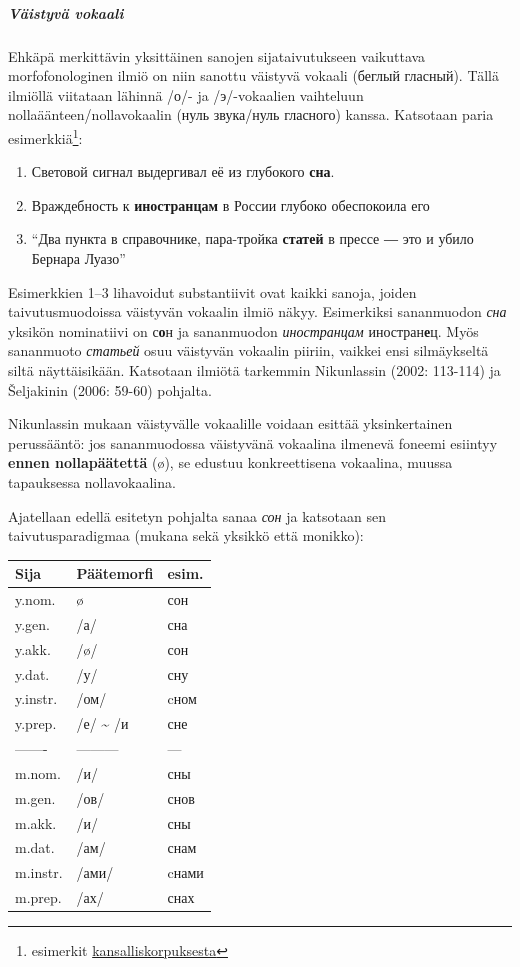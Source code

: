 \documentclass[]{scrartcl}
\providecommand{\tightlist}{%
  \setlength{\itemsep}{0pt}\setlength{\parskip}{0pt}}
\begin{document}
\subparagraph{Väistyvä vokaali}\label{vuxe4istyvuxe4-vokaali}

Ehkäpä merkittävin yksittäinen sanojen sijataivutukseen vaikuttava
morfofonologinen ilmiö on niin sanottu väistyvä vokaali (беглый
гласный). Tällä ilmiöllä viitataan lähinnä /о/- ja /э/-vokaalien
vaihteluun nollaäänteen/nollavokaalin (нуль звука/нуль гласного) kanssa.
Katsotaan paria esimerkkiä\footnote{esimerkit
  \href{http://ruscorpora.ru}{kansalliskorpuksesta}}:

\begin{enumerate}
\def\labelenumi{(\arabic{enumi})}
\tightlist
\item
  Световой сигнал выдергивал её из глубокого \textbf{сна}.
\item
  Враждебность к \textbf{иностранцам} в России глубоко обеспокоила его
\item
  ``Два пункта в справочнике, пара-тройка \textbf{статей} в прессе ― это
  и убило Бернара Луазо''
\end{enumerate}

Esimerkkien 1--3 lihavoidut substantiivit ovat kaikki sanoja, joiden
taivutusmuodoissa väistyvän vokaalin ilmiö näkyy. Esimerkiksi
sananmuodon \emph{сна} yksikön nominatiivi on с\textbf{о}н ja
sananmuodon \emph{иностранцам} иностран\textbf{е}ц. Myös sananmuoto
\emph{статьей} osuu väistyvän vokaalin piiriin, vaikkei ensi
silmäykseltä siltä näyttäisikään. Katsotaan ilmiötä tarkemmin
Nikunlassin (2002: 113-114) ja Šeljakinin (2006: 59-60) pohjalta.

Nikunlassin mukaan väistyvälle vokaalille voidaan esittää yksinkertainen
perussääntö: jos sananmuodossa väistyvänä vokaalina ilmenevä foneemi
esiintyy \textbf{ennen nollapäätettä} (ø), se edustuu konkreettisena
vokaalina, muussa tapauksessa nollavokaalina.

Ajatellaan edellä esitetyn pohjalta sanaa \emph{сон} ja katsotaan sen
taivutusparadigmaa (mukana sekä yksikkö että monikko):

\begin{longtable}[c]{@{}lll@{}}
\toprule
Sija & Päätemorfi & esim.\tabularnewline
\midrule
\endhead
y.nom. & ø & сон\tabularnewline
y.gen. & /а/ & сна\tabularnewline
y.akk. & /ø/  & сон\tabularnewline
y.dat. & /у/ & сну\tabularnewline
y.instr. & /ом/ & cном\tabularnewline
y.prep. & /е/ \textasciitilde{} /и & сне\tabularnewline
------- & --------- & ---\tabularnewline
m.nom. & /и/ & сны\tabularnewline
m.gen. & /ов/ & снов\tabularnewline
m.akk. & /и/ & сны\tabularnewline
m.dat. & /ам/ & снам\tabularnewline
m.instr. & /ами/ & cнами\tabularnewline
m.prep. & /ах/ & снах\tabularnewline
\bottomrule
\end{longtable}
\end{document}
